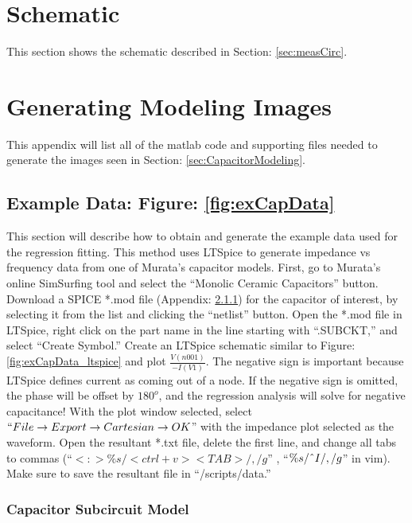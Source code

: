 \appendix{}
\appendixheaderon

\section{Schematic}
\label{app:schematic}
This section shows the schematic described in Section: \ref{sec:measCirc}.



\section{Generating Modeling Images}
\label{app:genModelingImages}
This appendix will list all of the matlab code and supporting files needed to generate the images seen in Section: \ref{sec:CapacitorModeling}.

\subsection{Example Data: Figure: \ref{fig:exCapData}}


This section will describe how to obtain and generate the example data used for the regression fitting. This method uses LTSpice to generate impedance vs frequency data from one of Murata's capacitor models. First, go to Murata's online SimSurfing tool \cite{simSurfing} and select the ``Monolic Ceramic Capacitors'' button. Download a SPICE *.mod file (Appendix: \ref{app:subcir}) for the capacitor of interest, by selecting it from the list and clicking the ``netlist'' button. Open the *.mod file in LTSpice, right click on the part name in the line starting with ``.SUBCKT,'' and select ``Create Symbol.'' Create an LTSpice schematic similar to Figure: \ref{fig:exCapData_ltspice} and plot $\frac{V(n001)}{-I(V1)}$. The negative sign is important because LTSpice defines current as coming out of a node. If the negative sign is omitted, the phase will be offset by $180^o$, and the regression analysis will solve for negative capacitance! With the plot window selected, select  $``File\rightarrow Export\rightarrow Cartesian\rightarrow OK$'' with the impedance plot selected as the waveform. Open the resultant *.txt file, delete the first line, and change all tabs to commas (``$<:>\%s/<ctrl+v><TAB>/,/g$'' , ``$\%s/\string^I/,/g$'' in vim). Make sure to save the resultant file in ``/scripts/data.''

\subsubsection{Capacitor Subcircuit Model}
\label{app:subcir}


